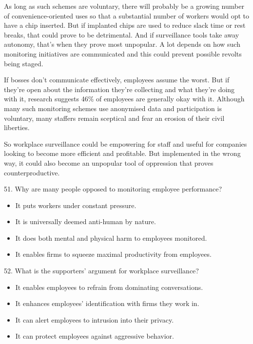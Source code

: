 \documentclass[UTF8,11pt]{ctexart}
\begin{document}
As long as such schemes are voluntary, there will probably be a growing number of convenience-oriented uses so that a substantial number of workers would opt to have a chip inserted. But if implanted chips are used to reduce slack time or rest breaks, that could prove to be detrimental. And if surveillance tools take away autonomy, that’s when they prove most unpopular. A lot depends on how such monitoring initiatives are communicated and this could prevent possible revolts being staged.


If bosses don’t communicate effectively, employees assume the worst. But if they’re open about the information they’re collecting and what they’re doing with it, research suggests 46\% of employees are generally okay with it. Although many such monitoring schemes use anonymised data and participation is voluntary, many staffers remain sceptical and fear an erosion of their civil liberties.


So workplace surveillance could be empowering for staff and useful for companies looking to become more efficient and profitable. But implemented in the wrong way, it could also become an unpopular tool of oppression that proves counterproductive.


51. Why are many people opposed to monitoring employee performance?


\begin{itemize}[leftmargin=2em,itemsep=.2em,topsep=.4em]\item[A.] It puts workers under constant pressure.
\item[B.] It is universally deemed anti-human by nature.
\item[C.] It does both mental and physical harm to employees monitored.
\item[D.] It enables firms to squeeze maximal productivity from employees.
\end{itemize}

52. What is the supporters’ argument for workplace surveillance?


\begin{itemize}[leftmargin=2em,itemsep=.2em,topsep=.4em]\item[A.] It enables employees to refrain from dominating conversations.
\item[B.] It enhances employees’ identification with firms they work in.
\item[C.] It can alert employees to intrusion into their privacy.
\item[D.] It can protect employees against aggressive behavior.
\end{itemize}
\end{document}
